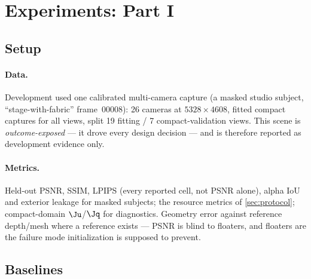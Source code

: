\section{Experiments: Part I}
\label{sec:exp1}

\subsection{Setup}
\label{sec:exp-setup}

\paragraph{Data.}
Development used one calibrated multi-camera capture (a masked studio subject,
``stage-with-fabric'' frame~00008): 26 cameras at $5328 \times 4608$, fitted compact captures
for all views, split 19 fitting / 7 compact-validation views.  This scene is
\emph{outcome-exposed} --- it drove every design decision --- and is therefore reported as
development evidence only.

\paragraph{Metrics.}
Held-out PSNR, SSIM, LPIPS (every reported cell, not PSNR alone), alpha IoU and exterior
leakage for masked subjects; the resource metrics of \cref{sec:protocol}; compact-domain
$\Ju$/$\Jq$ for diagnostics.  Geometry error against reference depth/mesh where a reference
exists --- PSNR is blind to floaters, and floaters are the failure mode initialization is
supposed to prevent.

\subsection{Baselines}
\label{sec:exp1-baselines}

